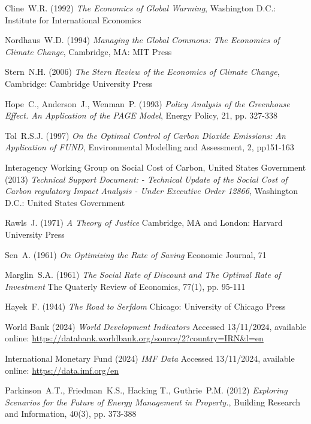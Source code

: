 \documentclass[12pt, oneside]{article}   	%
\begin{document}
\begin{thebibliography}{99}
 Cline~W.R. (1992)
\emph{The Economics of Global Warming},
Washington D.C.: Institute for International Economics
		
 Nordhaus~W.D. (1994)
\emph{Managing the Global Commons: The Economics of Climate Change},
Cambridge, MA: MIT Press
	
 Stern~N.H. (2006)
\emph{The Stern Review of the Economics of Climate Change},
Cambridge: Cambridge University Press
		
 Hope~C., Anderson~J., Wenman~P. (1993)
\emph{Policy Analysis of the Greenhouse Effect. An Application of the PAGE Model},
Energy Policy, 21, pp. 327-338
		
 Tol~R.S.J. (1997)
\emph{On the Optimal Control of Carbon Dioxide Emissions: An Application of FUND},
Environmental Modelling and Assessment, 2, pp151-163

 Interagency Working Group on Social Cost of Carbon, United States Government (2013)
\emph{Technical Support Document: - Technical Update of the Social Cost of Carbon regulatory Impact Analysis - Under Executive Order 12866},
Washington D.C.: United States Government

 Rawls~J. (1971)
\emph{A Theory of Justice}
Cambridge, MA and London: Harvard University Press

 Sen~A. (1961)
\emph{On Optimizing the Rate of Saving}
Economic Journal, 71
		
 Marglin~S.A. (1961)
\emph{The Social Rate of Discount and The Optimal Rate of Investment}
The Quaterly Review of Economics, 77(1), pp. 95-111

 Hayek~F. (1944)
\emph{The Road to Serfdom}
Chicago: University of Chicago Press

 World Bank (2024)
\emph{World Development Indicators}
Accessed 13/11/2024, available online: 
\url{https://databank.worldbank.org/source/2?country=IRN&l=en}

 International Monetary Fund (2024)
\emph{IMF Data}
Accessed 13/11/2024, available online: 
\url{https://data.imf.org/en}

 Parkinson~A.T., Friedman~K.S., Hacking T., Guthrie~P.M. (2012)
\emph{Exploring Scenarios for the Future of Energy Management in Property.},
Building Research and Information, 40(3), pp. 373-388
	
\end{thebibliography}
\end{document}
